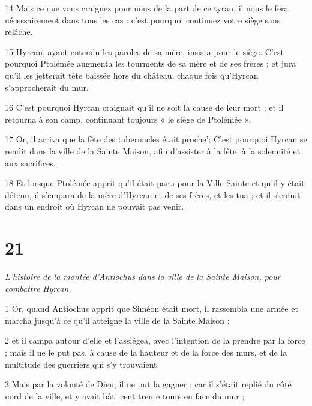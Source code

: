 \par 14 Mais ce que vous craignez pour nous de la part de ce tyran, il nous le fera nécessairement dans tous les cas : c'est pourquoi continuez votre siège sans relâche.

\par 15 Hyrcan, ayant entendu les paroles de sa mère, insista pour le siège. C'est pourquoi Ptolémée augmenta les tourments de sa mère et de ses frères ; et jura qu'il les jetterait tête baissée hors du château, chaque fois qu'Hyrcan s'approcherait du mur.

\par 16 C'est pourquoi Hyrcan craignait qu'il ne soit la cause de leur mort ; et il retourna à son camp, continuant toujours « le siège de Ptolémée ».

\par 17 Or, il arriva que la fête des tabernacles était proche'; C'est pourquoi Hyrcan se rendit dans la ville de la Sainte Maison, afin d'assister à la fête, à la solennité et aux sacrifices.

\par 18 Et lorsque Ptolémée apprit qu'il était parti pour la Ville Sainte et qu'il y était détenu, il s'empara de la mère d'Hyrcan et de ses frères, et les tua ; et il s'enfuit dans un endroit où Hyrcan ne pouvait pas venir.



\chapter{21}

\par \textit{L'histoire de la montée d'Antiochus dans la ville de la Sainte Maison, pour combattre Hyrcan.}

\par 1 Or, quand Antiochus apprit que Siméon était mort, il rassembla une armée et marcha jusqu'à ce qu'il atteigne la ville de la Sainte Maison :

\par 2 et il campa autour d'elle et l'assiégea, avec l'intention de la prendre par la force ; mais il ne le put pas, à cause de la hauteur et de la force des murs, et de la multitude des guerriers qui s'y trouvaient.

\par 3 Mais par la volonté de Dieu, il ne put la gagner ; car il s'était replié du côté nord de la ville, et y avait bâti cent trente tours en face du mur ;

